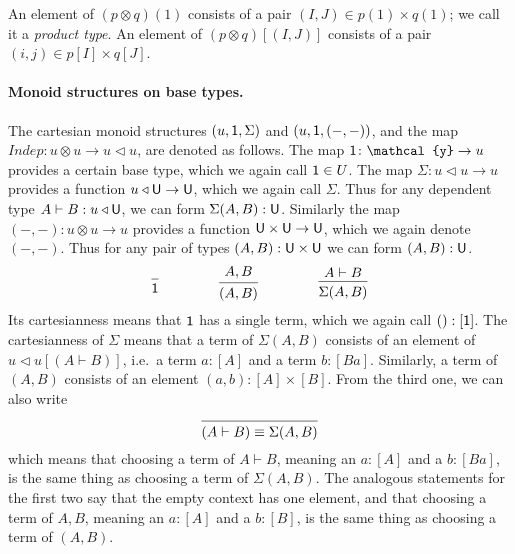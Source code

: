 \documentclass[11pt, one side, article]{memoir}
\theoremstyle{definition}
\theoremstyle{plain}
\newcommand{\Fun}[1]{\mathit{#1}}%
\newcommand{\tn}[1]{\textnormal{#1}}
\newcommand{\yon}{\mathcal{y}}
\newcommand{\0}{\textsf{0}}
\newcommand{\1}{\tn{\textsf{1}}}
\newcommand{\U}{\tn{\textsf{U}}}
\newcommand{\tri}{\mathbin{\triangleleft}}
\newcommand{\indep}{\Fun{Indep}}
\begin{document}
An element of $(p\otimes q)(1)$ consists of a pair $(I,J)\in p(1)\times q(1)$; we call it a \emph{product type}. An element of $(p\otimes q)[(I,J)]$ consists of a pair $(i,j)\in p[I]\times q[J]$. 

\paragraph{Monoid structures on base types.}

The cartesian monoid structures $(u,\1,\Sigma)$ and $(u,\1,(-,-))$, and the map $\indep\colon u\otimes u\to u\tri u$, are denoted as follows. The map $\1\colon\yon\to u$ provides a certain base type, which we again call $\1\in U$. The map $\Sigma\colon u\tri u\to u$ provides a function $u\tri\U\to\U$, which we again call $\Sigma$. Thus for any dependent type $A\vdash B:u\tri\U$, we can form $\Sigma(A,B):\U$. Similarly the map $(-,-)\colon u\otimes u\to u$ provides a function $\U\times \U\to\U$, which we again denote $(-,-)$. Thus for any pair of types $(A,B):\U\times \U$ we can form $(A,B):\U$. 
\[
  \begin{prooftree}
    \Infer0{\1}
  \end{prooftree}
  \hspace{.6in} 
  \begin{prooftree}
    \Hypo{A, B}
    \Infer1{(A,B)}
  \end{prooftree}
\hspace{.6in}
  \begin{prooftree}
    \Hypo{A\vdash B}
    \Infer1{\Sigma(A,B)}
  \end{prooftree}
\]
Its cartesianness means that $\1$ has a single term, which we again call $():[\1]$. The cartesianness of $\Sigma$ means that a term of $\Sigma(A,B)$ consists of an element of $u\tri u[(A\vdash B)]$, i.e.\ a term $a:[A]$ and a term $b:[Ba]$. Similarly, a term of $(A,B)$ consists of an element $(a,b):[A]\times[B]$. From the third one, we can also write
\begin{equation}\label{eqn.dep_vs_sigma}
\begin{prooftree}
  \Infer0{(A\vdash B)\equiv \Sigma(A,B)}
\end{prooftree}
\end{equation}
which means that choosing a term of $A\vdash B$, meaning an $a:[A]$ and a $b:[B a]$, is the same thing as choosing a term of $\Sigma(A,B)$. The analogous statements for the first two say that the empty context has one element, and that choosing a term of $A,B$, meaning an $a:[A]$ and a $b:[B]$, is the same thing as choosing a term of $(A,B)$.
\end{document}
